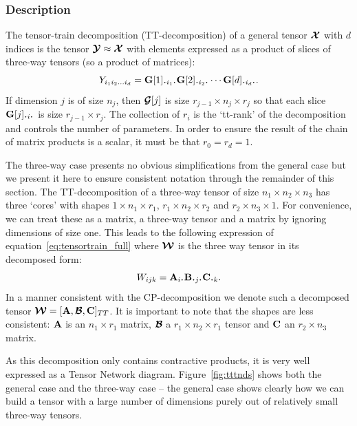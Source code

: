 \subsubsection{Description}
The tensor-train decomposition (TT-decomposition) of a general tensor \(\bm{\mathcal{X}}\) with
\(d\) indices is the tensor \(\bm{\mathcal{Y}} \approx\bm{\mathcal{X}}\) with elements expressed as a
product of slices of three-way tensors (so a product of matrices):
\begin{equation}
			\label{eq:tensortrain_full}
	{Y}_{i_1i_2\dots i_d} 
		= \mat{G}[1]_{\midbullet i_1 \midbullet}\mat{G}[2]_{\midbullet i_2 \midbullet}
			\cdots \mat{G}[d]_{\midbullet i_d \midbullet}.
\end{equation}
If dimension \(j\) is of size \(n_j\), then \(\bm{\mathcal{G}}[j]\) is size 
\(r_{j-1} \times n_j \times r_{j}\) so that each slice \(\mat{G}[j]_{\midbullet i \midbullet}\)
is size \(r_{j-1} \times r_{j}\). The collection of \(r_i\) is the `tt-rank' of the
decomposition and controls the number of parameters. In order to ensure the result of the chain
of matrix products is a scalar, it must be that \(r_0 = r_d = 1\). \autocite{Osedelets2011}

The three-way case presents no obvious simplifications from the general case but we present it
here to ensure consistent notation through the remainder of this section. The TT-decomposition
of a three-way tensor of size \(n_1 \times n_2 \times n_3\) has three `cores' with shapes
\(1 \times n_1 \times r_1\), \(r_1 \times n_2 \times r_2\) and \(r_2 \times n_3 \times 1\). For
convenience, we can treat these as a matrix, a three-way tensor and a matrix by ignoring 
dimensions of size one. This leads to the following expression of 
equation~\ref{eq:tensortrain_full} where \(\bm{\mathcal{W}}\) is the three way tensor in its
decomposed form:
\begin{equation} \label{eq:tensortrain_three}
	W_{ijk} = \mat{A}_{i\midbullet} \mat{B}_{\midbullet j \midbullet} \mat{C}_{\midbullet k}.
\end{equation} In a manner consistent with the CP-decomposition we denote such a decomposed
tensor \(\bm{\mathcal{W}} = [\mathbf{A},\bm{\mathcal{B}},\mathbf{C}]_{TT}\). It is important to note that the
shapes are less consistent: \(\mathbf{A}\) is an \(n_1 \times r_1\) matrix, \(\bm{\mathcal{B}}\) a
\(r_1 \times n_2 \times r_1\) tensor and \(\mathbf{C}\) an \(r_2 \times n_3\) matrix.

As this decomposition only contains contractive products, it is very well expressed as a Tensor
Network diagram. Figure~\ref{fig:tttnds} shows both the general case and the three-way case --
the general case shows clearly how we can build a tensor with a large number of dimensions purely
out of relatively small three-way tensors. 

